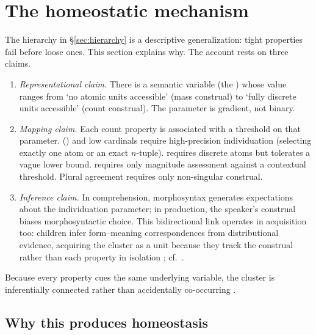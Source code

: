 \documentclass[12pt,a4paper]{article}
\begin{document}
\section{The homeostatic mechanism}\label{sec:mechanism}

The hierarchy in \S\ref{sec:hierarchy} is a descriptive generalization: tight properties fail before loose ones. This section explains why. The account rests on three claims.

\begin{enumerate}
\item \textit{Representational claim.} There is a semantic variable (the ) whose value ranges from `no atomic units accessible' (mass construal) to `fully discrete units accessible' (count construal). The parameter is gradient, not binary.

\item \textit{Mapping claim.} Each count property is associated with a threshold on that parameter. () and low cardinals require high-precision individuation (selecting exactly one atom or an exact $n$-tuple).  requires discrete atoms but tolerates a vague lower bound.  requires only magnitude assessment against a contextual threshold. Plural agreement requires only non-singular construal.

\item \textit{Inference claim.} In comprehension, morphosyntax generates expectations about the individuation parameter; in production, the speaker's construal biases morphosyntactic choice. This bidirectional link operates in acquisition too: children infer form--meaning correspondences from distributional evidence, acquiring the cluster as a unit because they track the construal rather than each property in isolation \citep{bybee2010}; cf.\ \textcite{tomasello2003}.
\end{enumerate}

Because every property cues the same underlying variable, the cluster is inferentially connected rather than accidentally co-occurring \citep{boyd1991,khalidi2013}.

\subsection{Why this produces homeostasis}
\end{document}
